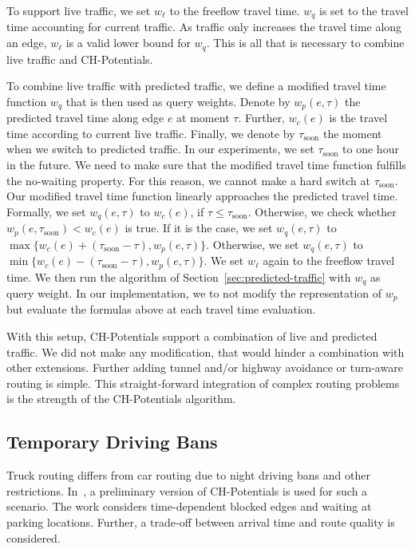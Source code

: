 \documentclass[a4paper,USenglish,cleveref, autoref, thm-restate]{lipics-v2019}
\begin{document}
To support live traffic, we set $w_\ell$ to the freeflow travel time.
$w_q$ is set to the travel time accounting for current traffic.
As traffic only increases the travel time along an edge, $w_\ell$ is a valid lower bound for $w_q$.
This is all that is necessary to combine live traffic and CH-Potentials.

To combine live traffic with predicted traffic, we define a modified travel time function $w_q$ that is then used as query weights.
Denote by $w_p(e,\tau)$ the predicted travel time along edge $e$ at moment $\tau$.
Further, $w_c(e)$ is the travel time according to current live traffic.
Finally, we denote by $\tau_{\mathrm{soon}}$ the moment when we switch to predicted traffic.
In our experiments, we set $\tau_{\mathrm{soon}}$ to one hour in the future.
We need to make sure that the modified travel time function fulfills the no-waiting property.
For this reason, we cannot make a hard switch at $\tau_{\mathrm{soon}}$.
Our modified travel time function linearly approaches the predicted travel time. %
%
Formally, we set $w_q(e,\tau)$ to $w_c(e)$, if $\tau \leq \tau_{\mathrm{soon}}$.
Otherwise, we check whether $w_p(e,\tau_{\mathrm{soon}}) < w_c(e)$ is true.
If it is the case, we set $w_q(e,\tau)$ to $\max\{w_c(e)+(\tau_{\mathrm{soon}}-\tau), w_p(e,\tau)\}$.
Otherwise, we set $w_q(e,\tau)$ to $\min\{w_c(e)-(\tau_{\mathrm{soon}}-\tau), w_p(e,\tau)\}$.
We set $w_\ell$ again to the freeflow travel time.
We then run the algorithm of Section~\ref{sec:predicted-traffic} with $w_q$ as query weight.
In our implementation, we to not modify the representation of $w_p$ but evaluate the formulas above at each travel time evaluation.

With this setup, CH-Potentials support a combination of live and predicted traffic.
We did not make any modification, that would hinder a combination with other extensions.
Further adding tunnel and/or highway avoidance or turn-aware routing is simple.
This straight-forward integration of complex routing problems is the strength of the CH-Potentials algorithm.

\subsection{Temporary Driving Bans}

Truck routing differs from car routing due to night driving bans and other restrictions.
In~\cite{kswz-erptd-20}, a preliminary version of CH-Potentials is used for such a scenario.
The work considers time-dependent blocked edges and waiting at parking locations.
Further, a trade-off between arrival time and route quality is considered.
\end{document}

